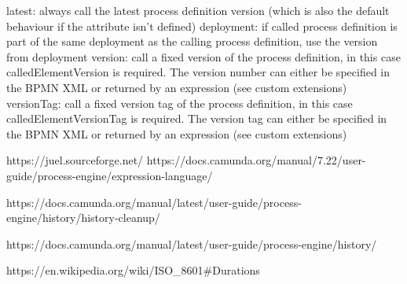     latest: always call the latest process definition version (which is also the default behaviour if the attribute isn’t defined)
    deployment: if called process definition is part of the same deployment as the calling process definition, use the version from deployment
    version: call a fixed version of the process definition, in this case calledElementVersion is required. The version number can either be specified in the BPMN XML or returned by an expression (see custom extensions)
    versionTag: call a fixed version tag of the process definition, in this case calledElementVersionTag is required. The version tag can either be specified in the BPMN XML or returned by an expression (see custom extensions)


https://juel.sourceforge.net/
https://docs.camunda.org/manual/7.22/user-guide/process-engine/expression-language/

https://docs.camunda.org/manual/latest/user-guide/process-engine/history/history-cleanup/

https://docs.camunda.org/manual/latest/user-guide/process-engine/history/

https://en.wikipedia.org/wiki/ISO_8601#Durations

